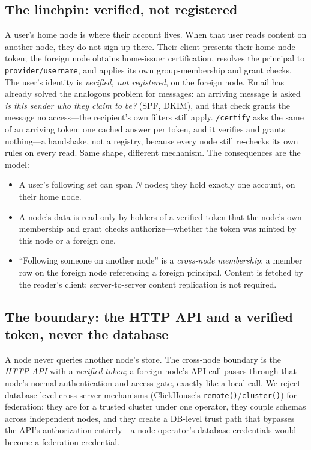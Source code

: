 \documentclass[sigconf, nonacm]{acmart}
\begin{document}
\subsection{The linchpin: verified, not registered}

A user's home node is where their account lives. When that user reads content
on another node, they do not sign up there. Their client presents their
home-node token; the foreign node obtains home-issuer certification, resolves
the principal to \texttt{provider/username}, and applies its own
group-membership and grant checks. The user's identity is \emph{verified, not
registered}, on the foreign node. Email has already solved the analogous
problem for messages: an arriving message is asked \emph{is this sender who
they claim to be?} (SPF, DKIM), and that check grants the message no
access---the recipient's own filters still apply. \texttt{/certify} asks the
same of an arriving token: one cached answer per token, and it verifies and
grants nothing---a handshake, not a registry, because every node still
re-checks its own rules on every read. Same shape, different mechanism. The
consequences are the model:

\begin{itemize}[leftmargin=*,nosep]
  \item A user's following set can span $N$ nodes; they hold exactly one
  account, on their home node.
  \item A node's data is read only by holders of a verified token that the
  node's own membership and grant checks authorize---whether the token was
  minted by this node or a foreign one.
  \item ``Following someone on another node'' is a \emph{cross-node
  membership}: a member row on the foreign node referencing a foreign
  principal. Content is fetched by the reader's client; server-to-server
  content replication is not required.
\end{itemize}

\subsection{The boundary: the HTTP API and a verified token, never the
database}

A node never queries another node's store. The cross-node boundary is the
\emph{HTTP API} with a \emph{verified token}; a foreign node's API call
passes through that node's normal authentication and access gate, exactly
like a local call. We reject database-level cross-server mechanisms
(ClickHouse's \texttt{remote()}/\texttt{cluster()}) for federation: they are
for a trusted cluster under one operator, they couple schemas across
independent nodes, and they create a DB-level trust path that bypasses the
API's authorization entirely---a node operator's database credentials would
become a federation credential.
\end{document}
